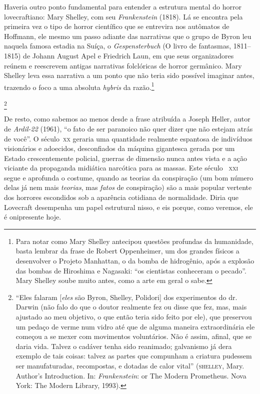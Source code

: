 Haveria outro ponto fundamental para entender a estrutura
mental do horror lovecraftiano: Mary Shelley, com seu
\emph{Frankenstein} (1818). Lá se encontra pela primeira vez o tipo de
horror científico que se entrevira nos autômatos de Hoffmann, ele mesmo
um passo adiante das narrativas que o grupo de Byron leu naquela famosa
estadia na Suíça, o \emph{Gespensterbuch} (O livro de fantasmas, 1811--1815)
de Johann August Apel e Friedrich Laun, em que seus organizadores reúnem
e reescrevem antigas narrativas folclóricas de horror germânico. Mary
Shelley leva essa narrativa a um ponto que não teria sido possível imaginar
antes, trazendo o foco a uma absoluta \emph{hybris} da razão.\footnote{Para
  notar como Mary Shelley antecipou questões profundas da humanidade,
  basta lembrar da frase de Robert Oppenheimer, um dos
  grandes físicos a desenvolver o Projeto Manhattan, o da bomba de
  hidrogênio, após a explosão das bombas de Hiroshima e Nagasaki: ``os
  cientistas conheceram o pecado''. Mary Shelley soube muito antes,
  como a arte em geral o sabe.}

\footnote{``Eles falaram {[}\emph{eles} são Byron,
  Shelley, Polidori{]} dos experimentos do dr.\,Darwin (não falo do que
  o doutor realmente fez ou disse que fez, mas, mais ajustado ao meu
  objetivo, o que então teria sido feito por ele), que preservou um
  pedaço de verme num vidro até que de alguma maneira extraordinária
  ele começou a se mexer com movimentos voluntários. Não é assim, afinal,
  que se daria vida. Talvez o cadáver tenha sido reanimado; galvanismo
  já dera exemplo de tais coisas: talvez as partes que compunham a
  criatura pudessem ser manufaturadas, recompostas, e dotadas de calor
  vital'' (\textsc{shelley}, Mary. Author's Introduction. In: 
  \emph{Frankenstein}: or The Modern Prometheus. Nova York: The Modern
  Library, 1993).} 

De resto, como sabemos ao menos desde a frase atribuída a Joseph Heller,
autor de \emph{Ardil-22} (1961), ``o fato de ser
paranoico não quer dizer que não estejam atrás de você''. O século~\textsc{xx}
geraria uma quantidade realmente espantosa de indivíduos visionários e
adoecidos, desconfiados da máquina gigantesca gerada por um Estado
crescentemente policial, guerras de dimensão nunca antes vista e a ação
viciante da propaganda midiática narcótica para as massas. Este século~
\textsc{xxi} segue e aprofunda o costume, quando as teorias da conspiração (um
bom número delas já nem mais \emph{teorias}, mas \emph{fatos} de
conspiração) são a mais popular vertente dos horrores escondidos sob a
aparência cotidiana de normalidade. Diria que Lovecraft desempenha um
papel estrutural nisso, e eis porque, como veremos, ele é onipresente
hoje.

